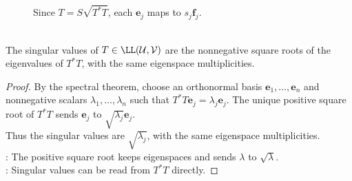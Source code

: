 \begin{figure}[H]
  \centering
  
  \caption{Since $T=S\sqrt{T^*T}$, each $\mathbf{e}_j$ maps to $s_j\mathbf{f}_j$.}
  \label{fig:singular-value-decomposition}
\end{figure}

\begin{proposition} \label{prop:singular-values-from-t-star-t} \\
The singular values of $T\in\LL(\mathcal{U},\mathcal{V})$ are the nonnegative square roots of the eigenvalues of $T^*T$, with the same eigenspace multiplicities.
\begin{proof}
By the spectral theorem, choose an orthonormal basis $\mathbf{e}_1,\ldots,\mathbf{e}_n$ and nonnegative scalars $\lambda_1,\ldots,\lambda_n$ such that $T^*T\mathbf{e}_j=\lambda_j\mathbf{e}_j$. The unique positive square root of $T^*T$ sends $\mathbf{e}_j$ to $\sqrt{\lambda_j}\mathbf{e}_j$.\\
Thus the singular values are $\sqrt{\lambda_j}$, with the same eigenspace multiplicities.\\
: The positive square root keeps eigenspaces and sends $\lambda$ to $\sqrt{\lambda}$.\\
: Singular values can be read from $T^*T$ directly.
\end{proof}
\end{proposition}

